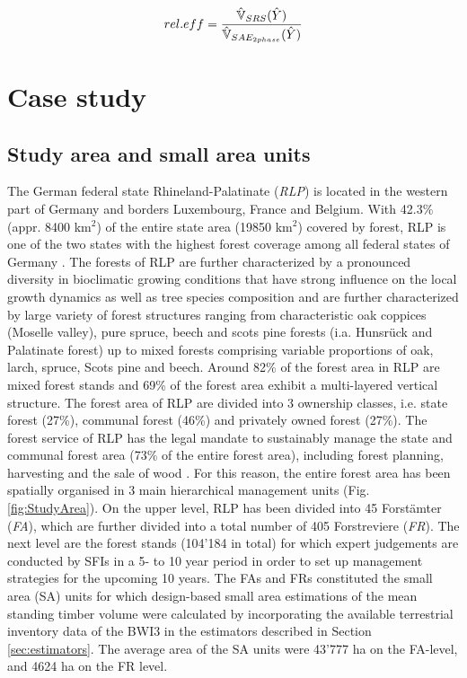 \begin{equation}\label{eq:releff}
rel.eff=\frac{\hat{\mathbb{V}}_{SRS}(\hat{Y})}{\hat{\mathbb{V}}_{SAE_{2phase}}(\hat{Y})}
\end{equation}

\newpage



\section{Case study}
\label{sec:CaseStudy}

\subsection{Study area and small area units}
\label{sec:studyarea}

The German federal state Rhineland-Palatinate (\textit{RLP}) is located in the western part of Germany and borders Luxembourg, France and Belgium. With 42.3\% (appr. 8400 km$^2$) of the entire state area (19850 km$^2$) covered by forest, RLP is one of the two states with the highest forest coverage among all federal states of Germany \citep{bwi3}. The forests of RLP are further characterized by a pronounced diversity in bioclimatic growing conditions that have strong influence on the local growth dynamics as well as tree species composition \citep{gauer2005} and are further characterized by large variety of forest structures ranging from characteristic oak coppices (Moselle valley), pure spruce, beech and scots pine forests (i.a. Hunsr{\"u}ck and Palatinate forest) up to mixed forests comprising variable proportions of oak, larch, spruce, Scots pine and beech. Around 82\% of the forest area in RLP are mixed forest stands and 69\% of the forest area exhibit a multi-layered vertical structure. The forest area of RLP are divided into 3 ownership classes, i.e. state forest (27\%), communal forest (46\%) and privately owned forest (27\%). The forest service of RLP has the legal mandate to sustainably manage the state and communal forest area (73\% of the entire forest area), including forest planning, harvesting and the sale of wood \citep{lwaldg_rlp}. For this reason, the entire forest area has been spatially organised in 3 main hierarchical management units (Fig. \ref{fig:StudyArea}). On the upper level, RLP has been divided into 45 Forst{\"a}mter (\textit{FA}), which are further divided into a total number of 405 Forstreviere (\textit{FR}). The next level are the forest stands (104'184 in total) for which expert judgements are conducted by SFIs in a 5- to 10 year period in order to set up management strategies for the upcoming 10 years. The FAs and FRs constituted the small area (SA) units for which design-based small area estimations of the mean standing timber volume were calculated by incorporating the available terrestrial inventory data of the BWI3 in the estimators described in Section \ref{sec:estimators}. The average area of the SA units were 43'777 ha on the FA-level, and 4624 ha on the FR level.

